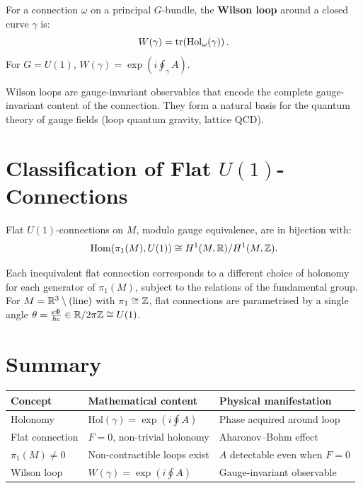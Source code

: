 \begin{definition}
For a connection $\omega$ on a principal $G$-bundle, the \textbf{Wilson loop} around a closed curve $\gamma$ is:
\begin{equation}
W(\gamma) = \operatorname{tr}\!\left(\mathrm{Hol}_\omega(\gamma)\right).
\end{equation}
For $G = U(1)$, $W(\gamma) = \exp\!\left(i\oint_\gamma A\right)$.
\end{definition}

Wilson loops are gauge-invariant observables that encode the complete gauge-invariant content of the connection. They form a natural basis for the quantum theory of gauge fields (loop quantum gravity, lattice QCD).

\section{Classification of Flat $U(1)$-Connections}

\begin{theorem}
Flat $U(1)$-connections on $M$, modulo gauge equivalence, are in bijection with:
\begin{equation}
\operatorname{Hom}(\pi_1(M), U(1)) \cong H^1(M, \mathbb{R}) / H^1(M, \mathbb{Z}).
\end{equation}
\end{theorem}

Each inequivalent flat connection corresponds to a different choice of holonomy for each generator of $\pi_1(M)$, subject to the relations of the fundamental group. For $M = \mathbb{R}^3 \setminus (\text{line})$ with $\pi_1 \cong \mathbb{Z}$, flat connections are parametrised by a single angle $\theta = \frac{e\Phi}{\hbar c} \in \mathbb{R} / 2\pi\mathbb{Z} \cong U(1)$.

\section{Summary}

\begin{table}[h]
\centering
\renewcommand{\arraystretch}{1.4}
\begin{tabular}{lll}
\toprule
\textbf{Concept} & \textbf{Mathematical content} & \textbf{Physical manifestation} \\
\midrule
Holonomy & $\mathrm{Hol}(\gamma) = \exp(i\oint A)$ & Phase acquired around loop \\
Flat connection & $F = 0$, non-trivial holonomy & Aharonov--Bohm effect \\
$\pi_1(M) \neq 0$ & Non-contractible loops exist & $A$ detectable even when $F = 0$ \\
Wilson loop & $W(\gamma) = \exp(i\oint A)$ & Gauge-invariant observable \\
\bottomrule
\end{tabular}
\end{table}

